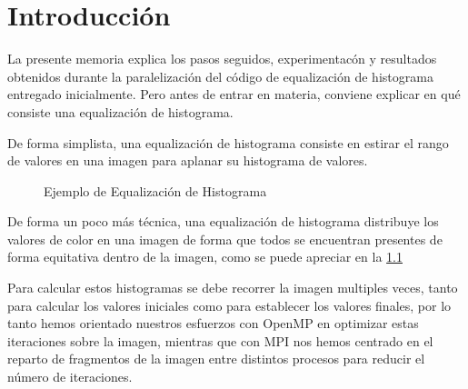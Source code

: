 \documentclass[12pt]{report} %
\begin{document}
\listoffigures
\thispagestyle{fancy}

\listoftables
\thispagestyle{fancy}

\clearpage
{} %

\chapter{Introducción}
\label{chap:Intro}

La presente memoria explica los pasos seguidos, experimentacón y resultados obtenidos durante la
paralelización del código de equalización de histograma entregado inicialmente. Pero antes de entrar
en materia, conviene explicar en qué consiste una equalización de histograma.

De forma simplista, una equalización de histograma consiste en estirar el rango de valores en una
imagen para aplanar su histograma de valores.

\begin{figure}[H]
    \caption{Ejemplo de Equalización de Histograma}
    \label{fig:hist_eq}
\end{figure}

De forma un poco más técnica, una equalización de histograma distribuye los valores de color en una imagen de
forma que todos se encuentran presentes de forma equitativa dentro de la imagen, como se puede apreciar
en la \ref{fig:hist_eq} 

Para calcular estos histogramas se debe recorrer la imagen multiples veces, tanto para
calcular los valores iniciales como para establecer los valores finales, por lo tanto hemos orientado
nuestros esfuerzos con OpenMP \parencite{openmp_openmp_2004} en optimizar estas iteraciones sobre
la imagen, mientras que con MPI \parencite{spi-inc_open_2004} nos hemos centrado en el reparto
de fragmentos de la imagen entre distintos procesos para reducir el número de iteraciones.
\end{document}
